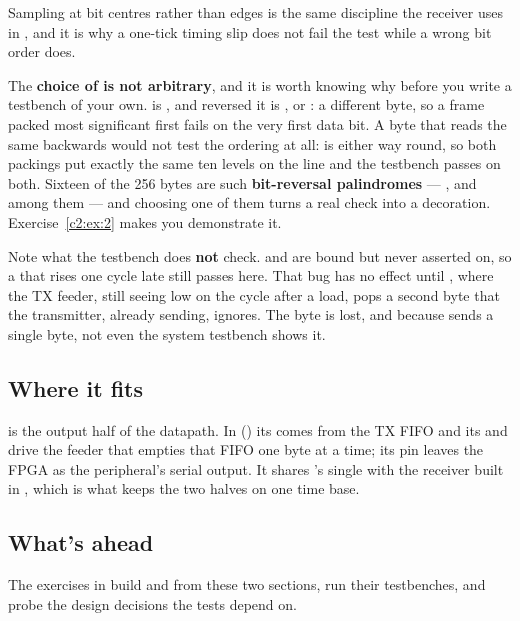 Sampling at bit centres rather than edges is the same discipline the receiver uses in ,
and it is why a one-tick timing slip does not fail the test while a wrong bit order does.

The \textbf{choice of  is not arbitrary}, and it is worth knowing why before you write a
testbench of your own.  is , and reversed it is , or
: a different byte, so a frame packed most significant first fails on the very first data
bit. A byte that reads the same backwards would not test the ordering at all:  is
 either way round, so both packings put exactly the same ten levels on the line and
the testbench passes on both. Sixteen of the 256 bytes are such \textbf{bit-reversal palindromes}
--- ,  and  among them --- and choosing one of them turns a real
check into a decoration. Exercise~\ref{c2:ex:2} makes you demonstrate it.

Note what the testbench does \textbf{not} check.  and  are bound but never
asserted on, so a  that rises one cycle late still passes here. That bug has no effect
until , where the TX feeder, still seeing  low on the cycle after a load, pops
a second byte that the transmitter, already sending, ignores. The byte is lost, and because
 sends a single byte, not even the system testbench shows it.

\subsection{Where it fits}
\label{c2:sec:uart_tx_fits}
 is the output half of the datapath. In  () its 
comes from the TX FIFO and its  and  drive the feeder that empties that FIFO
one byte at a time; its  pin leaves the FPGA as the peripheral's serial output. It shares
's single  with the receiver built in , which is what keeps the
two halves on one time base.

\subsection{What's ahead}
The exercises in  build  and  from these two
sections, run their testbenches, and probe the design decisions the tests depend on.
